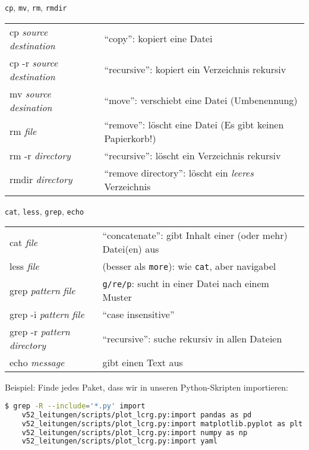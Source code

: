 \begin{frame}{\texttt{cp}, \texttt{mv}, \texttt{rm}, \texttt{rmdir}}
  \begin{tabu}{>{\ttfamily}l X[,L]}
    cp \textit{source} \textit{destination}    & \enquote{copy}: kopiert eine Datei \\
    cp -r \textit{source} \textit{destination} & \enquote{recursive}: kopiert ein Verzeichnis rekursiv \\
    mv \textit{source} \textit{desination}     & \enquote{move}: verschiebt eine Datei (Umbenennung) \\
    rm \textit{file}                           & \enquote{remove}: löscht eine Datei (Es gibt keinen Papierkorb!) \\
    rm -r \textit{directory}                   & \enquote{recursive}: löscht ein Verzeichnis rekursiv \\
    rmdir \textit{directory}                   & \enquote{remove directory}: löscht ein \emph{leeres} Verzeichnis
  \end{tabu}
\end{frame}

\begin{frame}[fragile]{\texttt{cat}, \texttt{less}, \texttt{grep}, \texttt{echo}}
  \begin{tabu}{>{\ttfamily}l X[,L]}
    cat \textit{file}                           & \enquote{concatenate}: gibt Inhalt einer (oder mehr) Datei(en) aus \\
    less \textit{file}                          & (besser als \texttt{more}): wie \texttt{cat}, aber navigabel \\
    grep \textit{pattern} \textit{file}         & \texttt{g/re/p}: sucht in einer Datei nach einem Muster \\
    grep -i \textit{pattern} \textit{file}      & \enquote{case insensitive} \\
    grep -r \textit{pattern} \textit{directory} & \enquote{recursive}: suche rekursiv in allen Dateien \\
    echo \textit{message}                       & gibt einen Text aus
  \end{tabu}

  Beispiel: Finde jedes Paket, dass wir in unseren Python-Skripten importieren:
  
  \begin{lstlisting}[language=bash]
    $ grep -R --include='*.py' import
    v52_leitungen/scripts/plot_lcrg.py:import pandas as pd
    v52_leitungen/scripts/plot_lcrg.py:import matplotlib.pyplot as plt
    v52_leitungen/scripts/plot_lcrg.py:import numpy as np
    v52_leitungen/scripts/plot_lcrg.py:import yaml
  \end{lstlisting}

\end{frame}

